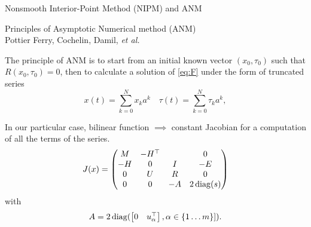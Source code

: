 \begin{frame}{Nonsmooth Interior-Point Method (NIPM) and ANM}
 \begin{block}{Principles of Asymptotic Numerical method (ANM)\\ Pottier Ferry, Cochelin, Damil, \textit{et al.}}
  
      The principle of ANM is to start from an initial known vector $(x_0,\tau_0)$ such that $R(x_0,\tau_0)=0$, then to calculate a solution of \eqref{eq:F} under the form of truncated series
      \begin{displaymath}
        x(t) = \sum_{k=0}^N x_k a^k \quad \tau(t) = \sum_{k=0}^N \tau_k a^k,
      \end{displaymath}
    
       In our particular case, bilinear function $\implies$ constant Jacobian for a computation of all the terms of the series.
      \begin{equation}
        \label{eq:23}
        J(x) =
        \begin{pmatrix}
          M &  -H^\top &   & 0\\
          -H & 0 & I & -E \\
          0 & U & R & 0 \\
          0 & 0 & -A & 2\, {\rm diag}(s) \\
        \end{pmatrix}
      \end{equation}
      with
      \begin{equation}
        \label{eq:22}
        A =2\, {\rm diag}(
        \begin{bmatrix} 0 & u_\alpha^\top
        \end{bmatrix}
        , \alpha \in \{1\ldots m\}]).
      \end{equation}
  \end{block}
\end{frame}

